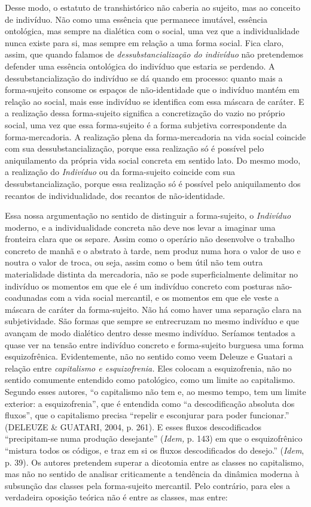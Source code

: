 Desse modo, o estatuto de transhistórico não caberia ao sujeito, mas ao
conceito de indivíduo. Não como uma essência que permanece imutável,
essência ontológica, mas sempre na dialética com o social, uma vez que a
individualidade nunca existe para si, mas sempre em relação a uma forma
social. Fica claro, assim, que quando falamos de
\emph{dessubstancialização do indivíduo} não pretendemos defender uma
essência ontológica do indivíduo que estaria se perdendo. A
dessubstancialização do indivíduo se dá quando em processo: quanto mais
a forma-sujeito consome os espaços de não-identidade que o indivíduo
mantém em relação ao social, mais esse indivíduo se identifica com essa
máscara de caráter. E a realização dessa forma-sujeito significa a
concretização do vazio no próprio social, uma vez que essa forma-sujeito
é a forma subjetiva correspondente da forma-mercadoria. A realização
plena da forma-mercadoria na vida social coincide com sua
dessubstancialização, porque essa realização só é possível pelo
aniquilamento da própria vida social concreta em sentido lato. Do mesmo
modo, a realização do \emph{Indivíduo} ou da forma-sujeito coincide com
sua dessubstancialização, porque essa realização só é possível pelo
aniquilamento dos recantos de individualidade, dos recantos de
não-identidade.

Essa nossa argumentação no sentido de distinguir a forma-sujeito, o
\emph{Indivíduo} moderno, e a individualidade concreta não deve nos
levar a imaginar uma fronteira clara que os separe. Assim como o
operário não desenvolve o trabalho concreto de manhã e o abstrato à
tarde, nem produz numa hora o valor de uso e noutra o valor de troca, ou
seja, assim como o bem útil não tem outra materialidade distinta da
mercadoria, não se pode superficialmente delimitar no indivíduo os
momentos em que ele é um indivíduo concreto com posturas não-coadunadas
com a vida social mercantil, e os momentos em que ele veste a máscara de
caráter da forma-sujeito. Não há como haver uma separação clara na
subjetividade. São formas que sempre se entrecruzam no mesmo indivíduo e
que avançam de modo dialético dentro desse mesmo indivíduo. Seríamos
tentados a quase ver na tensão entre indivíduo concreto e forma-sujeito
burguesa uma forma esquizofrênica. Evidentemente, não no sentido como
veem Deleuze e Guatari a relação entre \emph{capitalismo e
esquizofrenia.} Eles colocam a esquizofrenia, não no sentido comumente
entendido como patológico, como um limite ao capitalismo. Segundo esses
autores, ``o capitalismo não tem e, ao mesmo tempo, tem um limite
exterior: a esquizofrenia'', que é entendida como ``a descodificação
absoluta dos fluxos'', que o capitalismo precisa ``repelir e esconjurar
para poder funcionar.'' (DELEUZE \& GUATARI, 2004, p. 261). E esses
fluxos descodificados ``precipitam-se numa produção desejante''
(\emph{Idem,} p. 143) em que o esquizofrênico ``mistura todos os
códigos, e traz em si os fluxos descodificados do desejo.''
(\emph{Idem}, p. 39). Os autores pretendem superar a dicotomia entre as
classes no capitalismo, mas não no sentido de analisar criticamente a
tendência da dinâmica moderna à subsunção das classes pela forma-sujeito
mercantil. Pelo contrário, para eles a verdadeira oposição teórica não é
entre as classes, mas entre:

